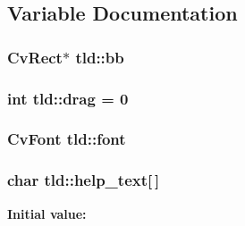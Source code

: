 \subsection{Variable Documentation}
\hypertarget{namespacetld_aa5e13bbb9a53d3e9103d430b6113b08b}{
\subsubsection[{bb}]{\setlength{\rightskip}{0pt plus 5cm}Cv\-Rect$\ast$ tld\-::bb\hspace{0.3cm}{\ttfamily [static]}}}\label{namespacetld_aa5e13bbb9a53d3e9103d430b6113b08b}
\hypertarget{namespacetld_a7cfa165f34457693b8898cfa78e51945}{
\subsubsection[{drag}]{\setlength{\rightskip}{0pt plus 5cm}int tld\-::drag = 0\hspace{0.3cm}{\ttfamily [static]}}}\label{namespacetld_a7cfa165f34457693b8898cfa78e51945}
\hypertarget{namespacetld_a16a44df30fb791b45dd103ba1541fb67}{
\subsubsection[{font}]{\setlength{\rightskip}{0pt plus 5cm}Cv\-Font tld\-::font\hspace{0.3cm}{\ttfamily [static]}}}\label{namespacetld_a16a44df30fb791b45dd103ba1541fb67}
\hypertarget{namespacetld_a17f0b1eb181c0395a541e031b203040a}{
\subsubsection[{help\-\_\-text}]{\setlength{\rightskip}{0pt plus 5cm}char tld\-::help\-\_\-text\mbox{[}$\,$\mbox{]}\hspace{0.3cm}{\ttfamily [static]}}}\label{namespacetld_a17f0b1eb181c0395a541e031b203040a}
{\bfseries Initial value\-:}
